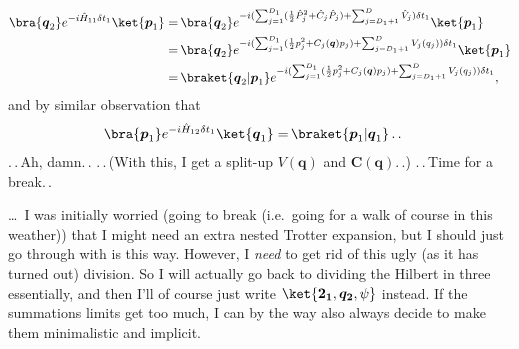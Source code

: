 \documentclass{report}
\begin{document}
\begin{align}
\begin{aligned}
	\bra{\boldsymbol{q}_2}
		e^{-i  \hat H_{11} \delta t_1 } 
	\ket{\boldsymbol{p}_1} %
	=&\,
	\bra{\boldsymbol{q}_2}
		e^{-i  
			(
				\sum_{j=1}^{D_1} 
					(
						\frac{1}{2} \hat P_{j}^2 + 
						\hat C_{j} \hat P_{j}
					) + 
				\sum_{j=D_1+1}^{D} \hat V_{j}  
			) \delta t_1 
		} 
	\ket{\boldsymbol{p}_1} %
	\\=&\,
	\bra{\boldsymbol{q}_2}
		e^{-i  
			(
				\sum_{j=1}^{D_1} 
					(
						\frac{1}{2} p_{j}^2 + 
						C_{j}(\boldsymbol{q}) p_{j}
					) + 
				\sum_{j=D_1+1}^{D} V_{j}(q_j)
			) \delta t_1 
		} 
	\ket{\boldsymbol{p}_1}
	\\=&\,
	\braket{\boldsymbol{q}_2 | \boldsymbol{p}_1}
		e^{-i  
			(
				\sum_{j=1}^{D_1} 
					(
						\frac{1}{2} p_{j}^2 + 
						C_{j}(\boldsymbol{q}) p_{j}
					) + 
				\sum_{j=D_1+1}^{D} V_{j}(q_j)
			) \delta t_1 
		},
\end{aligned}
\end{align}
and by similar observation that 
\begin{align}
\begin{aligned}
	\bra{\boldsymbol{p}_1}
		e^{-i  \hat H_{12} \delta t_1 } 
	\ket{\boldsymbol{q}_1} %
	=&\,
	\braket{\boldsymbol{p}_1 | \boldsymbol{q}_1}
	\,.\,.
\end{aligned}
\end{align}
.\,.\,Ah, damn.\,. .\,.\,(With this, I get a split-up $V(\boldsymbol{q})$ and $\boldsymbol C(\boldsymbol{q})$.\,.) .\,.\,Time for a break.\,. 

\ldots\ I was initially worried (going to break (i.e.\ going for a walk of course in this weather)) that I might need an extra nested Trotter expansion, but I should just go through with is this way. However, I \emph{need} to get rid of this ugly (as it has turned out) division. So I will actually go back to dividing the Hilbert in three essentially, and then I'll of course just write $\ket{\boldsymbol{2_1}, \boldsymbol{q_2}, \psi}$ instead. If the summations limits get too much, I can by the way also always decide to make them minimalistic and implicit.
\end{document}
